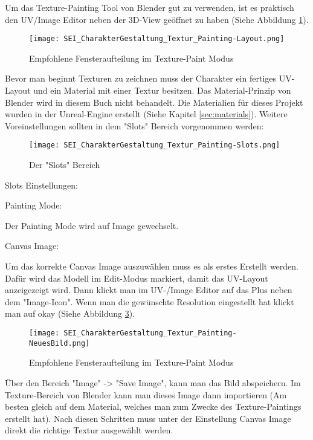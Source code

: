 Um das Texture-Painting Tool von Blender gut zu verwenden, ist es praktisch den UV/Image Editor neben der 3D-View
geöffnet zu haben (Siehe Abbildung \ref{picture:tex_painting_windows}).

\begin{figure}[H]
    \centering
    \texttt{[image: SEI\_CharakterGestaltung\_Textur\_Painting-Layout.png]}
    \caption{Empfohlene Fensteraufteilung im Texture-Paint Modus}
    \label{picture:tex_painting_windows}
\end{figure}

Bevor man beginnt Texturen zu zeichnen muss der Charakter ein fertiges UV-Layout und ein Material mit einer Textur
besitzen. Das Material-Prinzip von Blender \citep{blender:materials_blender} wird in diesem Buch nicht behandelt.
Die Materialien für dieses Projekt wurden in der Unreal-Engine erstellt (Siehe Kapitel \ref{sec:materials}).
Weitere Voreinstellungen sollten in dem "Slots" Bereich vorgenommen werden:

\begin{figure}[H]
    \centering
    \texttt{[image: SEI\_CharakterGestaltung\_Textur\_Painting-Slots.png]}
    \caption{Der "Slots" Bereich }
    \label{picture:tex_painting_slots}
\end{figure}

Slots Einstellungen:


    Painting Mode:

    Der Painting Mode wird auf Image gewechselt.


    Canvas Image:

    Um das korrekte Canvas Image auszuwählen muss es als erstes Erstellt werden.
    Dafür wird das Modell im Edit-Modus markiert, damit das UV-Layout
    anzeigezeigt wird. Dann klickt man im UV-/Image Editor auf das  Plus neben
    dem "Image-Icon". Wenn man die gewünschte Resolution eingestellt hat klickt man
    auf okay (Siehe Abbildung \ref{picture:new_image}).


    \begin{figure}[H]
        \centering
        \texttt{[image: SEI\_CharakterGestaltung\_Textur\_Painting-NeuesBild.png]}
        \caption{Empfohlene Fensteraufteilung im Texture-Paint Modus}
        \label{picture:new_image}
    \end{figure}


    Über den Bereich "Image" -> "Save Image", kann man das Bild abspeichern.
    Im Texture-Bereich von Blender kann man dieses Image dann importieren (Am
    besten gleich auf dem Material, welches man zum Zwecke des Texture-Paintings
    erstellt hat). Nach diesen Schritten muss unter der Einstellung Canvas Image
    direkt die richtige Textur ausgewählt werden.



